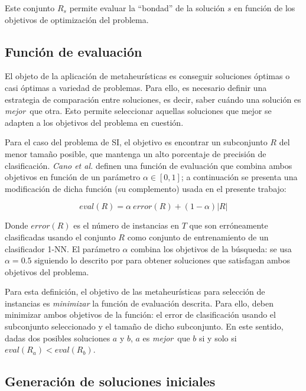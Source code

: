 Este conjunto $R_s$ permite evaluar la ``bondad'' de la solución $s$ en función de los objetivos de optimización del problema.

\subsection{Función de evaluación}

El objeto de la aplicación de metaheurísticas es conseguir soluciones óptimas o casi óptimas a variedad de problemas. Para ello, es necesario definir una estrategia de comparación entre soluciones, es decir, saber cuándo una solución es \guillemotleft\emph{mejor}\guillemotright\ que otra. Esto permite seleccionar aquellas soluciones que mejor se adapten a los objetivos del problema en cuestión.

Para el caso del problema de SI, el objetivo es encontrar un subconjunto $R$ del menor tamaño posible, que mantenga un alto porcentaje de precisión de clasificación. \emph{Cano et al.} \cite{cano2003using} definen una función de evaluación que combina ambos objetivos en función de un parámetro $\alpha \in [0,1]$; a continuación se presenta una modificación de dicha función (su complemento) usada en el presente trabajo:

\begin{equation}
\mathit{eval}(R) = \alpha\ \mathit{error}(R) + (1 - \alpha) \vert R \vert
\end{equation}

Donde $\mathit{error}(R)$ es el número de instancias en $T$ que son erróneamente clasificadas usando el conjunto $R$ como conjunto de entrenamiento de un clasificador 1-NN. El parámetro $\alpha$ combina los objetivos de la búsqueda: se usa $\alpha = 0.5$ siguiendo lo descrito por \cite{cano2003using} para obtener soluciones que satisfagan ambos objetivos del problema.

Para esta definición, el objetivo de las metaheurísticas para selección de instancias es \emph{minimizar} la función de evaluación descrita. Para ello, deben minimizar ambos objetivos de la función: el error de clasificación usando el subconjunto seleccionado y el tamaño de dicho subconjunto. En este sentido, dadas dos posibles soluciones $a$ y $b$, $a$ es \guillemotleft\emph{mejor}\guillemotright\ que $b$ si y solo si $\mathit{eval}(R_a) < \mathit{eval}(R_b)$.

\subsection{Generación de soluciones iniciales}
\label{generacion-sol-inic}

